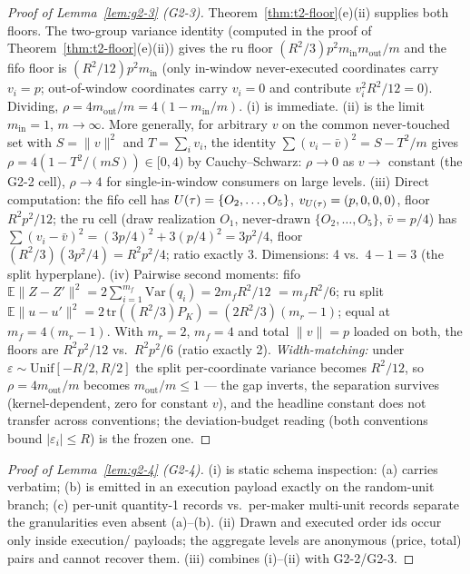\begin{proof}[Proof of Lemma~\ref{lem:g2-3} (G2-3)]
Theorem~\ref{thm:t2-floor}(e)(ii) supplies both floors. The two-group
variance identity (computed in the proof of
Theorem~\ref{thm:t2-floor}(e)(ii)) gives the ru floor
$(R^2/3)p^2m_{\mathrm{in}}m_{\mathrm{out}}/m$ and the fifo floor is
$(R^2/12)p^2m_{\mathrm{in}}$ (only in-window never-executed coordinates
carry $v_i = p$; out-of-window coordinates carry $v_i = 0$ and contribute
$v_i^2R^2/12 = 0$). Dividing,
$\rho = 4m_{\mathrm{out}}/m = 4(1 - m_{\mathrm{in}}/m)$. (i) is immediate.
(ii) is the limit $m_{\mathrm{in}} = 1$, $m \to \infty$. More generally, for
arbitrary $v$ on the common never-touched set with $S = \|v\|^2$ and
$T = \sum_i v_i$, the identity
$\sum(v_i - \bar{v})^2 = S - T^2/m$ gives
$\rho = 4(1 - T^2/(mS)) \in [0,4)$ by Cauchy--Schwarz: $\rho \to 0$ as
$v \to$ constant (the G2-2 cell), $\rho \to 4$ for single-in-window
consumers on large levels. (iii) Direct computation: the fifo cell has
$U(\tau) = \{O_2,\dots,O_5\}$, $v_{U(\tau)} = (p,0,0,0)$, floor
$R^2p^2/12$; the ru cell (draw realization $O_1$, never-drawn
$\{O_2,\dots,O_5\}$, $\bar{v} = p/4$) has
$\sum(v_i - \bar{v})^2 = (3p/4)^2 + 3(p/4)^2 = 3p^2/4$, floor
$(R^2/3)(3p^2/4) = R^2p^2/4$; ratio exactly 3. Dimensions: 4 vs.\
$4 - 1 = 3$ (the split hyperplane). (iv) Pairwise second moments: fifo
$\mathbb{E}\|Z - Z'\|^2 = 2\sum_{i=1}^{m_f}\mathrm{Var}(q_i) = 2m_fR^2/12$
$= m_fR^2/6$; ru split
$\mathbb{E}\|u - u'\|^2 = 2\,\mathrm{tr}((R^2/3)P_K) = (2R^2/3)(m_r - 1)$;
equal at $m_f = 4(m_r - 1)$. With $m_r = 2$, $m_f = 4$ and total
$\|v\| = p$ loaded on both, the floors are $R^2p^2/12$ vs.\ $R^2p^2/6$
(ratio exactly 2). \emph{Width-matching:} under
$\varepsilon \sim \mathrm{Unif}[-R/2,R/2]$ the split per-coordinate
variance becomes $R^2/12$, so $\rho = 4m_{\mathrm{out}}/m$ becomes
$m_{\mathrm{out}}/m \le 1$ --- the gap inverts, the separation survives
(kernel-dependent, zero for constant $v$), and the headline constant does
not transfer across conventions; the deviation-budget reading (both
conventions bound $|\varepsilon_i| \le R$) is the frozen one.
\end{proof}

\begin{proof}[Proof of Lemma~\ref{lem:g2-4} (G2-4)]
(i) is static schema inspection: (a)  carries
\fld{allocation\_rule} verbatim; (b) \fld{allocation\_draw} is emitted in an
execution payload exactly on the random-unit branch; (c) per-unit
quantity-1 records vs.\ per-maker multi-unit records separate the granularities
even absent (a)--(b). (ii) Drawn and executed order ids occur only inside
execution/\fld{allocation\_draw} payloads; the aggregate levels are
anonymous (price, total) pairs and cannot recover them. (iii) combines
(i)--(ii) with G2-2/G2-3.
\end{proof}

